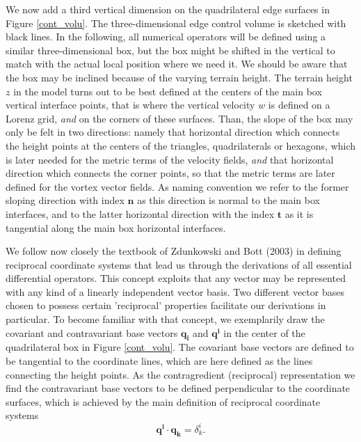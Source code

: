 We now add a third vertical dimension on the quadrilateral edge surfaces
in Figure \ref{cont_volu}. The three-dimensional edge control volume is
sketched with black lines. In the following, all numerical operators will be
defined using a similar three-dimensional box, but the box might be shifted in the
vertical to match with the actual local position where we need it.
We should be aware that the box may be inclined because of the varying terrain height.
The terrain height $z$ in the model turns out to be best defined at the centers of
the main box vertical interface points, that is where the vertical velocity $w$ is defined on
a Lorenz grid, {\it and} on the corners of these surfaces. Than, the slope of the
box may only be felt in two directions: namely that horizontal direction which connects the height points at the centers of the triangles, quadrilaterals or hexagons, which is later needed for the metric terms of the velocity fields, {\it and} that horizontal direction which connects the corner points, so that the metric terms are
later defined for the vortex vector fields.
As naming convention we refer to the former sloping direction with index
$\mathbf{n}$ as this direction is normal to the main box interfaces,
and to the latter horizontal direction with the index $\mathbf{t}$ as it is
tangential along the main box horizontal interfaces.

We follow now closely the textbook of Zdunkowski and Bott (2003) in defining
reciprocal coordinate systems that lead us through the derivations of all
essential differential operators. This concept exploits that any vector may be represented
with any kind of a linearly independent vector basis.
Two different vector bases chosen to possess certain 'reciprocal' properties
facilitate our derivations in particular.
To become familiar with that concept, we exemplarily draw the
covariant and contravariant base vectors
$\mathbf{q_i}$ and $\mathbf{q^i}$ in the center of the quadrilateral box in
Figure \ref{cont_volu}.
The covariant base vectors are defined to be tangential to the
coordinate lines, which are here defined as the lines connecting the height
points. As the contragredient (reciprocal) representation we
find the contravariant base vectors to be defined perpendicular to the coordinate surfaces,
which is achieved by the main definition of reciprocal coordinate systems
\begin{equation}
 \mathbf{q^i}\cdot\mathbf{q_k}=\delta_k^i.
\label{contragredient}
\end{equation}

